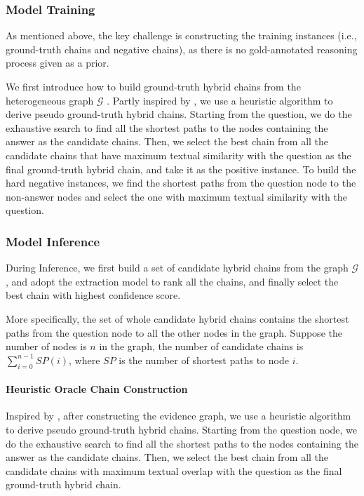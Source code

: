 \documentclass[11pt]{article}
\begin{document}
	\subsubsection{Model Training}
	As mentioned above, the key challenge is constructing the training instances (i.e., ground-truth chains and negative chains), as there is no gold-annotated reasoning process given as a prior. 
	
	We first introduce how to build ground-truth hybrid chains from the heterogeneous graph $\mathcal{G}$ . 
	Partly inspired by \citet{chen2019multi}, we use a heuristic algorithm to derive pseudo ground-truth hybrid chains. 
	Starting from the question, we do the exhaustive search to find all the shortest paths to the nodes containing the answer as the candidate chains. 
	Then, we select the best chain from all the candidate chains that have maximum textual similarity with the question as the final ground-truth hybrid chain, and take it as the positive instance.
To build the hard negative instances, we find the shortest paths from the question node to the non-answer nodes and select the one with maximum textual similarity with the question.
	\subsubsection{Model Inference}
	During Inference, we first build a set of candidate hybrid chains from the graph $\mathcal{G}$, and adopt the extraction model to rank all the chains, and finally select the best chain with highest confidence score.
	
	More specifically, the set of whole candidate hybrid chains contains the shortest paths from the question node to all the other nodes in the graph. 
	Suppose the number of nodes is $n$ in the graph, the number of candidate chains is $\sum^{n-1}_{i=0}SP(i)$, where $SP$ is the number of shortest paths to node $i$.
	
	\iffalse
	\paragraph{Heuristic Oracle Chain Construction}
	
	
	Inspired by \citet{chen2019multi}, after constructing the evidence graph, we use a heuristic algorithm to derive pseudo ground-truth hybrid chains. Starting from the question node, we do the exhaustive search to find all the shortest paths to the nodes containing the answer as the candidate chains. 
	Then, we select the best chain from all the candidate chains with maximum textual overlap with the question as the final ground-truth hybrid chain.
	
\end{document}
